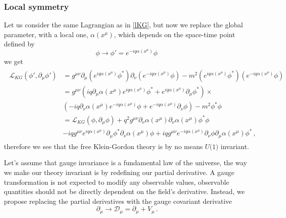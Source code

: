 \subsubsection{Local symmetry}

Let us consider the same Lagrangian as in \autoref{lKG}, but now we replace the global parameter, with a local one, $\alpha(x^\mu)$, which depends on the space-time point defined by
\begin{equation}
	\phi \rightarrow \phi'=e^{-iq\alpha(x^\mu)}\phi\,
\end{equation}
we get
\begin{align}
	\begin{array}{lllll}
		\mathcal{L}_{KG}(\phi',\partial_\mu\phi')&=g^{\mu\nu}\partial_\mu(e^{iq\alpha(x^\mu)}\phi^*)\partial_\nu(e^{-iq\alpha(x^\mu)}\phi) - m^2 (e^{iq\alpha(x^\mu)}\phi^*)(e^{-iq\alpha(x^\mu)}\phi) \\
		&=g^{\mu\nu}(iq\partial_\mu\alpha(x^\mu)e^{iq\alpha(x^\mu)}\phi^*+e^{iq\alpha(x^\mu)}\partial_\mu\phi^*)\times \\ 
		&(-iq\partial_\nu\alpha(x^\mu)e^{-iq\alpha(x^\mu)}\phi+e^{-iq\alpha(x^\mu)}\partial_\nu\phi) - m^2\phi^*\phi \\
		&=\mathcal{L}_{KG}(\phi,\partial_\mu\phi)+q^2g^{\mu\nu}\partial_\nu\alpha(x^\mu)\partial_\nu\alpha(x^\mu)\phi^*\phi \\
		&-iqg^{\mu\nu}e^{iq\alpha(x^\mu)}\partial_\mu\phi^*\partial_\nu\alpha(x^\mu)\phi+iqg^{\mu\nu}e^{-iq\alpha(x^\mu)}\partial_\nu\phi\partial_\mu\alpha(x^\mu)\phi^*\,,
	\end{array}
\end{align}
therefore we see that the free Klein-Gordon theory is by no means $U\textrm{(1)}$ invariant.

Let's assume that gauge invariance is a fundamental law of the universe, the way we make our theory invariant is by redefining our partial derivative.
A gauge transformation is not expected to modify any observable values, observable quantities should not be directly dependent on the field's derivative.
Instead, we propose replacing the partial derivatives with the gauge covariant derivative 
\begin{equation}
	\label{pd1}
	\partial_\mu\rightarrow\mathcal{D}_\mu =\partial_\mu+V_\mu\,.
\end{equation}

